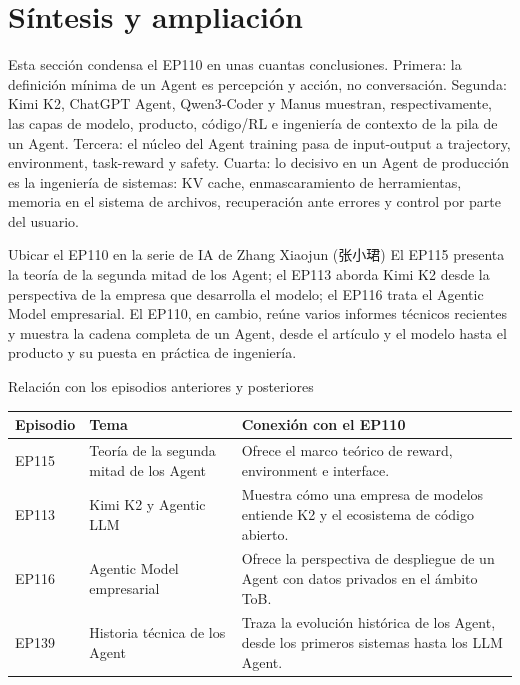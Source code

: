 \section{Síntesis y ampliación}

Esta sección condensa el EP110 en unas cuantas conclusiones. Primera: la definición mínima de un Agent es percepción y acción, no conversación. Segunda: Kimi K2, ChatGPT Agent, Qwen3-Coder y Manus muestran, respectivamente, las capas de modelo, producto, código/RL e ingeniería de contexto de la pila de un Agent. Tercera: el núcleo del Agent training pasa de input-output a trajectory, environment, task-reward y safety. Cuarta: lo decisivo en un Agent de producción es la ingeniería de sistemas: KV cache, enmascaramiento de herramientas, memoria en el sistema de archivos, recuperación ante errores y control por parte del usuario.

\begin{importantbox}{Ubicar el EP110 en la serie de IA de Zhang Xiaojun (张小珺)}
El EP115 presenta la teoría de la segunda mitad de los Agent; el EP113 aborda Kimi K2 desde la perspectiva de la empresa que desarrolla el modelo; el EP116 trata el Agentic Model empresarial. El EP110, en cambio, reúne varios informes técnicos recientes y muestra la cadena completa de un Agent, desde el artículo y el modelo hasta el producto y su puesta en práctica de ingeniería.
\end{importantbox}

\begin{knowledgebox}{Relación con los episodios anteriores y posteriores}
\begin{tabularx}{\textwidth}{p{}p{}X}
\toprule
Episodio & Tema & Conexión con el EP110 \\
\midrule
EP115 & Teoría de la segunda mitad de los Agent & Ofrece el marco teórico de reward, environment e interface. \\
EP113 & Kimi K2 y Agentic LLM & Muestra cómo una empresa de modelos entiende K2 y el ecosistema de código abierto. \\
EP116 & Agentic Model empresarial & Ofrece la perspectiva de despliegue de un Agent con datos privados en el ámbito ToB. \\
EP139 & Historia técnica de los Agent & Traza la evolución histórica de los Agent, desde los primeros sistemas hasta los LLM Agent. \\
\bottomrule
\end{tabularx}
\end{knowledgebox}

